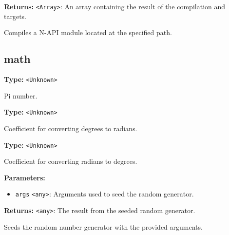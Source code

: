 \documentclass[12pt,a4paper]{article}
\begin{document}
\noindent \textbf{Returns:} \texttt{<Array>}: An array containing the result of the compilation and targets.

\noindent Compiles a N-API module located at the specified path.


\subsection{math}
\vspace{5mm}
\noindent {}\vspace{4mm}


\noindent \textbf{Type:} \texttt{<Unknown>}

\noindent Pi number.

\vspace{5mm}
\noindent {}\vspace{4mm}


\noindent \textbf{Type:} \texttt{<Unknown>}

\noindent Coefficient for converting degrees to radians.

\vspace{5mm}
\noindent {}\vspace{4mm}


\noindent \textbf{Type:} \texttt{<Unknown>}

\noindent Coefficient for converting radians to degrees.

\vspace{5mm}
\noindent {}


\noindent \textbf{Parameters:}
\begin{itemize}
  \item \texttt{args} \texttt{<any>}: Arguments used to seed the random generator.
\end{itemize}

\noindent \textbf{Returns:} \texttt{<any>}: The result from the seeded random generator.

\noindent Seeds the random number generator with the provided arguments.

\vspace{5mm}
\noindent {}
\end{document}
